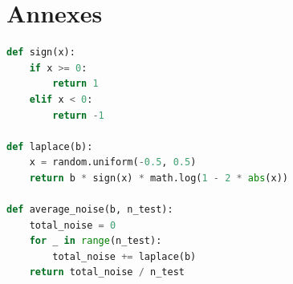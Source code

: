 \documentclass{article}
\begin{document}
\newpage
\section*{Annexes}

\begin{lstlisting}[language=Python, caption={Fonction de génération de bruit Laplacien}, label={lst:laplace}]
def sign(x):
    if x >= 0:
        return 1
    elif x < 0:
        return -1

def laplace(b):
    x = random.uniform(-0.5, 0.5)
    return b * sign(x) * math.log(1 - 2 * abs(x))

def average_noise(b, n_test):
    total_noise = 0
    for _ in range(n_test):
        total_noise += laplace(b)
    return total_noise / n_test 
\end{lstlisting}
\end{document}
